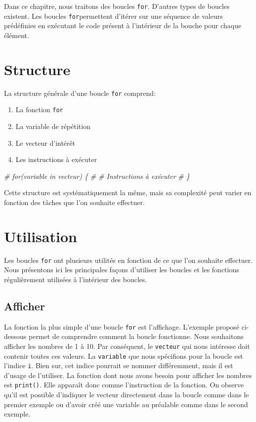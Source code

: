 \documentclass[
]{book}
\newenvironment{Shaded}{\begin{snugshade}}{\end{snugshade}}
\newcommand{\CommentTok}[1]{\textcolor[rgb]{0.56,0.35,0.01}{\textit{#1}}}
\providecommand{\tightlist}{%
  \setlength{\itemsep}{0pt}\setlength{\parskip}{0pt}}
\begin{document}
Dans ce chapitre, nous traitons des boucles \texttt{for}. D'autres types de boucles existent. Les boucles \texttt{for}permettent d'itérer sur une séquence de valeurs prédéfinies en exécutant le code présent à l'intérieur de la bouche pour chaque élément.

\section{Structure}\label{structure}

La structure générale d'une boucle \texttt{for} comprend:

\begin{enumerate}
\def\labelenumi{\arabic{enumi}.}
\tightlist
\item
  La fonction \texttt{for}
\item
  La variable de répétition
\item
  Le vecteur d'intérêt
\item
  Les instructions à exécuter
\end{enumerate}

\begin{Shaded}
\begin{Highlighting}[]
\CommentTok{\# for(variable in vecteur) \{}
\CommentTok{\#   \# Instructions à exécuter}
\CommentTok{\# \}}
\end{Highlighting}
\end{Shaded}

Cette structure est systématiquement la même, mais sa complexité peut varier en fonction des tâches que l'on souhaite effectuer.

\section{Utilisation}\label{utilisation}

Les boucles \texttt{for} ont plusieurs utilités en fonction de ce que l'on souhaite effectuer. Nous présentons ici les principales façons d'utiliser les boucles et les fonctions régulièrement utilisées à l'intérieur des boucles.

\subsection{Afficher}\label{afficher}

La fonction la plus simple d'une boucle \texttt{for} est l'affichage. L'exemple proposé ci-dessous permet de comprendre comment la boucle fonctionne. Nous souhaitons afficher les nombres de 1 à 10. Par conséquent, le \texttt{vecteur} qui nous intéresse doit contenir toutes ces valeurs. La \texttt{variable} que nous spécifions pour la boucle est l'indice \texttt{i}. Bien sur, cet indice pourrait se nommer différemment, mais il est d'usage de l'utiliser. La fonction dont nous avons besoin pour afficher les nombres est \texttt{print()}. Elle apparaît donc comme l'instruction de la fonction. On observe qu'il est possible d'indiquer le vecteur directement dans la boucle comme dans le premier exemple ou d'avoir créé une variable au préalable comme dans le second exemple.
\end{document}
